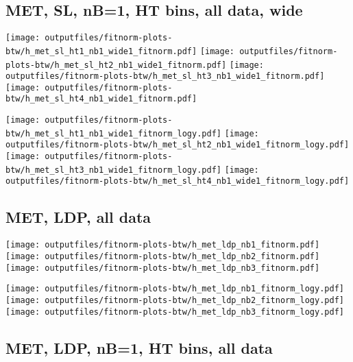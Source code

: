 \documentclass[11pt]{article}
\begin{document}
     \clearpage
     \subsection{ MET, SL, nB=1, HT bins, all data, wide}

    \noindent
     \texttt{[image: outputfiles/fitnorm-plots-btw/h\_met\_sl\_ht1\_nb1\_wide1\_fitnorm.pdf]}
     \texttt{[image: outputfiles/fitnorm-plots-btw/h\_met\_sl\_ht2\_nb1\_wide1\_fitnorm.pdf]}
     \texttt{[image: outputfiles/fitnorm-plots-btw/h\_met\_sl\_ht3\_nb1\_wide1\_fitnorm.pdf]}
     \texttt{[image: outputfiles/fitnorm-plots-btw/h\_met\_sl\_ht4\_nb1\_wide1\_fitnorm.pdf]}

    \noindent
     \texttt{[image: outputfiles/fitnorm-plots-btw/h\_met\_sl\_ht1\_nb1\_wide1\_fitnorm\_logy.pdf]}
     \texttt{[image: outputfiles/fitnorm-plots-btw/h\_met\_sl\_ht2\_nb1\_wide1\_fitnorm\_logy.pdf]}
     \texttt{[image: outputfiles/fitnorm-plots-btw/h\_met\_sl\_ht3\_nb1\_wide1\_fitnorm\_logy.pdf]}
     \texttt{[image: outputfiles/fitnorm-plots-btw/h\_met\_sl\_ht4\_nb1\_wide1\_fitnorm\_logy.pdf]}


     \clearpage


    \subsection{ MET, LDP, all data}

    \noindent
     \texttt{[image: outputfiles/fitnorm-plots-btw/h\_met\_ldp\_nb1\_fitnorm.pdf]}
     \texttt{[image: outputfiles/fitnorm-plots-btw/h\_met\_ldp\_nb2\_fitnorm.pdf]}
     \texttt{[image: outputfiles/fitnorm-plots-btw/h\_met\_ldp\_nb3\_fitnorm.pdf]}

    \noindent
     \texttt{[image: outputfiles/fitnorm-plots-btw/h\_met\_ldp\_nb1\_fitnorm\_logy.pdf]}
     \texttt{[image: outputfiles/fitnorm-plots-btw/h\_met\_ldp\_nb2\_fitnorm\_logy.pdf]}
     \texttt{[image: outputfiles/fitnorm-plots-btw/h\_met\_ldp\_nb3\_fitnorm\_logy.pdf]}


     \subsection{ MET, LDP, nB=1, HT bins, all data}
\end{document}
